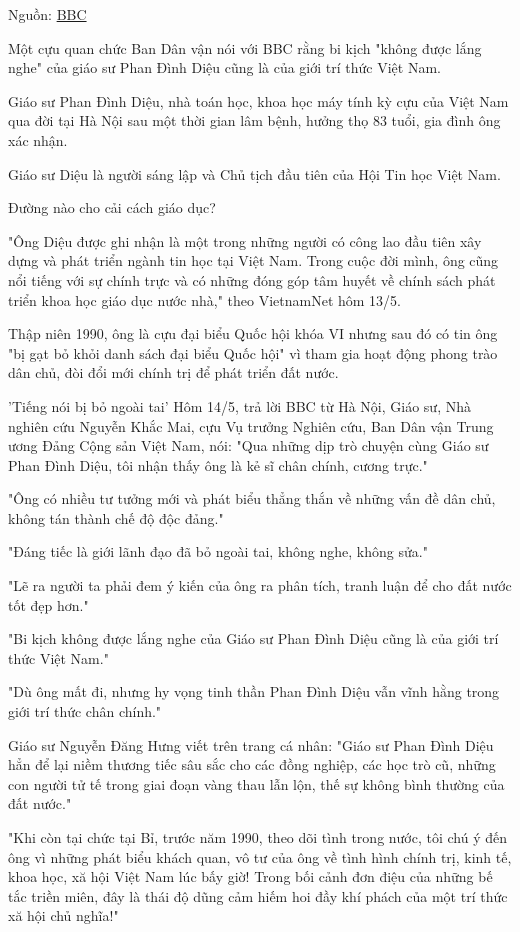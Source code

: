 Nguồn: \href{https://www.bbc.com/vietnamese/vietnam-44098055}{BBC}

Một cựu quan chức Ban Dân vận nói với BBC rằng bi kịch "không được lắng nghe" của giáo sư Phan Đình Diệu cũng là của giới trí thức Việt Nam.

Giáo sư Phan Đình Diệu, nhà toán học, khoa học máy tính kỳ cựu của Việt Nam qua đời tại Hà Nội sau một thời gian lâm bệnh, hưởng thọ 83 tuổi, gia đình ông xác nhận.

Giáo sư Diệu là người sáng lập và Chủ tịch đầu tiên của Hội Tin học Việt Nam.

Đường nào cho cải cách giáo dục?

"Ông Diệu được ghi nhận là một trong những người có công lao đầu tiên xây dựng và phát triển ngành tin học tại Việt Nam. Trong cuộc đời mình, ông cũng nổi tiếng với sự chính trực và có những đóng góp tâm huyết về chính sách phát triển khoa học giáo dục nước nhà," theo VietnamNet hôm 13/5.

Thập niên 1990, ông là cựu đại biểu Quốc hội khóa VI nhưng sau đó có tin ông "bị gạt bỏ khỏi danh sách đại biểu Quốc hội" vì tham gia hoạt động phong trào dân chủ, đòi đổi mới chính trị để phát triển đất nước.

'Tiếng nói bị bỏ ngoài tai'
Hôm 14/5, trả lời BBC từ Hà Nội, Giáo sư, Nhà nghiên cứu Nguyễn Khắc Mai, cựu Vụ trưởng Nghiên cứu, Ban Dân vận Trung ương Đảng Cộng sản Việt Nam, nói: "Qua những dịp trò chuyện cùng Giáo sư Phan Đình Diệu, tôi nhận thấy ông là kẻ sĩ chân chính, cương trực."

"Ông có nhiều tư tưởng mới và phát biểu thẳng thắn về những vấn đề dân chủ, không tán thành chế độ độc đảng."

"Đáng tiếc là giới lãnh đạo đã bỏ ngoài tai, không nghe, không sửa."

"Lẽ ra người ta phải đem ý kiến của ông ra phân tích, tranh luận để cho đất nước tốt đẹp hơn."

"Bi kịch không được lắng nghe của Giáo sư Phan Đình Diệu cũng là của giới trí thức Việt Nam."

"Dù ông mất đi, nhưng hy vọng tinh thần Phan Đình Diệu vẫn vĩnh hằng trong giới trí thức chân chính."


Giáo sư Nguyễn Đăng Hưng viết trên trang cá nhân: "Giáo sư Phan Đình Diệu hẳn để lại niềm thương tiếc sâu sắc cho các đồng nghiệp, các học trò cũ, những con người tử tế trong giai đoạn vàng thau lẫn lộn, thế sự không bình thường của đất nước."

"Khi còn tại chức tại Bỉ, trước năm 1990, theo dõi tình trong nước, tôi chú ý đến ông vì những phát biểu khách quan, vô tư của ông về tình hình chính trị, kinh tế, khoa học, xă hội Việt Nam lúc bấy giờ! Trong bối cảnh đơn điệu của những bế tắc triền miên, đây là thái độ dũng cảm hiếm hoi đầy khí phách của một trí thức xă hội chủ nghĩa!"

